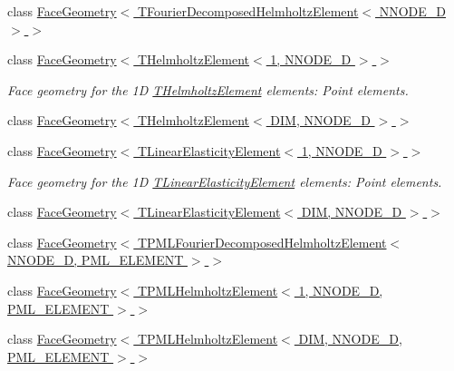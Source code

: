 \begin{DoxyCompactItemize}
\item 
class \hyperlink{classoomph_1_1FaceGeometry_3_01TFourierDecomposedHelmholtzElement_3_01NNODE__1D_01_4_01_4}{Face\+Geometry$<$ T\+Fourier\+Decomposed\+Helmholtz\+Element$<$ N\+N\+O\+D\+E\+\_\+D $>$ $>$}
\item 
class \hyperlink{classoomph_1_1FaceGeometry_3_01THelmholtzElement_3_011_00_01NNODE__1D_01_4_01_4}{Face\+Geometry$<$ T\+Helmholtz\+Element$<$ 1, N\+N\+O\+D\+E\+\_\+D $>$ $>$}
\begin{DoxyCompactList}\small\item\em Face geometry for the 1D \hyperlink{classoomph_1_1THelmholtzElement}{T\+Helmholtz\+Element} elements\+: Point elements. \end{DoxyCompactList}\item 
class \hyperlink{classoomph_1_1FaceGeometry_3_01THelmholtzElement_3_01DIM_00_01NNODE__1D_01_4_01_4}{Face\+Geometry$<$ T\+Helmholtz\+Element$<$ D\+I\+M, N\+N\+O\+D\+E\+\_\+D $>$ $>$}
\item 
class \hyperlink{classoomph_1_1FaceGeometry_3_01TLinearElasticityElement_3_011_00_01NNODE__1D_01_4_01_4}{Face\+Geometry$<$ T\+Linear\+Elasticity\+Element$<$ 1, N\+N\+O\+D\+E\+\_\+D $>$ $>$}
\begin{DoxyCompactList}\small\item\em Face geometry for the 1D \hyperlink{classoomph_1_1TLinearElasticityElement}{T\+Linear\+Elasticity\+Element} elements\+: Point elements. \end{DoxyCompactList}\item 
class \hyperlink{classoomph_1_1FaceGeometry_3_01TLinearElasticityElement_3_01DIM_00_01NNODE__1D_01_4_01_4}{Face\+Geometry$<$ T\+Linear\+Elasticity\+Element$<$ D\+I\+M, N\+N\+O\+D\+E\+\_\+D $>$ $>$}
\item 
class \hyperlink{classoomph_1_1FaceGeometry_3_01TPMLFourierDecomposedHelmholtzElement_3_01NNODE__1D_00_01PML__ELEMENT_01_4_01_4}{Face\+Geometry$<$ T\+P\+M\+L\+Fourier\+Decomposed\+Helmholtz\+Element$<$ N\+N\+O\+D\+E\+\_\+D, P\+M\+L\+\_\+\+E\+L\+E\+M\+E\+N\+T $>$ $>$}
\item 
class \hyperlink{classoomph_1_1FaceGeometry_3_01TPMLHelmholtzElement_3_011_00_01NNODE__1D_00_01PML__ELEMENT_01_4_01_4}{Face\+Geometry$<$ T\+P\+M\+L\+Helmholtz\+Element$<$ 1, N\+N\+O\+D\+E\+\_\+D, P\+M\+L\+\_\+\+E\+L\+E\+M\+E\+N\+T $>$ $>$}
\item 
class \hyperlink{classoomph_1_1FaceGeometry_3_01TPMLHelmholtzElement_3_01DIM_00_01NNODE__1D_00_01PML__ELEMENT_01_4_01_4}{Face\+Geometry$<$ T\+P\+M\+L\+Helmholtz\+Element$<$ D\+I\+M, N\+N\+O\+D\+E\+\_\+D, P\+M\+L\+\_\+\+E\+L\+E\+M\+E\+N\+T $>$ $>$}

\end{DoxyCompactItemize}
